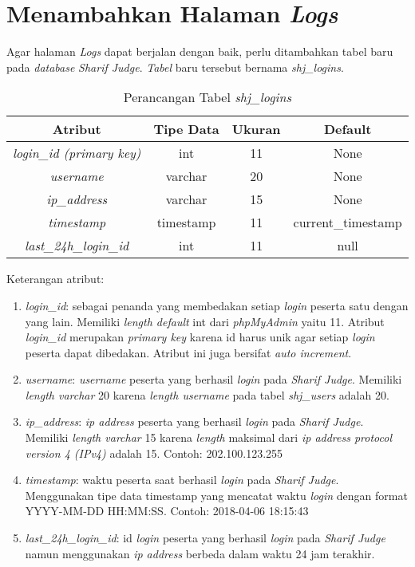 \section{Menambahkan Halaman \textit{Logs}}%
\label{chap:logs}
Agar halaman \textit{Logs} dapat berjalan dengan baik, perlu ditambahkan tabel baru pada \textit{database} \textit{Sharif Judge}.  \textit{Tabel} baru tersebut bernama \textit{shj\_logins}. 
\begin{table}[H] %
	\centering 
	\caption{Perancangan Tabel \textit{shj\_logins}}
	\label{tab:tabellogs}
		\begin{tabular}{|c|c|c|c|}
			\hline
			\textbf{Atribut} & \textbf{Tipe Data} & \textbf{Ukuran}  & \textbf{Default} \\
			\hline
			\textit{login\_id (primary key)} & int & 11  & None \\
			\hline
			\textit{username} & varchar & 20  & None \\
			\hline
			\textit{ip\_address} & varchar & 15  & None \\
			\hline
			\textit{timestamp} & timestamp & 11  & current\_timestamp \\
			\hline
			\textit{last\_24h\_login\_id}	 & int & 11  & null \\
			\hline
		\end{tabular}
\end{table}

Keterangan atribut:
\begin{enumerate}
	\item \textit{login\_id}: sebagai penanda yang membedakan setiap \textit{login} peserta satu dengan yang lain. Memiliki \textit{length default} int dari \textit{phpMyAdmin} yaitu 11. Atribut \textit{login\_id} merupakan \textit{primary key} karena id harus unik agar setiap \textit{login} peserta dapat dibedakan. Atribut ini juga bersifat \textit{auto increment}.
	\item \textit{username}: \textit{username} peserta yang berhasil \textit{login} pada \textit{Sharif Judge}. Memiliki \textit{length varchar} 20 karena \textit{length username} pada tabel \textit{shj\_users} adalah 20.
	\item \textit{ip\_address}: \textit{ip address} peserta yang berhasil \textit{login} pada \textit{Sharif Judge}. Memiliki \textit{length varchar} 15 karena \textit{length} maksimal dari \textit{ip address protocol version 4 (IPv4)} adalah 15. Contoh: 202.100.123.255
	\item \textit{timestamp}: waktu peserta saat berhasil \textit{login} pada \textit{Sharif Judge}. Menggunakan tipe data timestamp yang mencatat waktu \textit{login} dengan format YYYY-MM-DD HH:MM:SS. Contoh: 2018-04-06 18:15:43
	\item \textit{last\_24h\_login\_id}: id \textit{login} peserta yang berhasil \textit{login} pada \textit{Sharif Judge} namun menggunakan \textit{ip address} berbeda dalam waktu 24 jam terakhir.
\end{enumerate}

